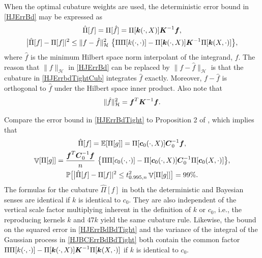 \documentclass[sts]{imsart}
\numberwithin{equation}{section}
\theoremstyle{plain}
\newcommand{\calH}{\mathcal{H}}
\newcommand{\vC}{\boldsymbol{C}}
\DeclareMathOperator{\Var}{\mathbb{V}}
\newcommand{\BOGOS}{\citetalias{BriEtal18a}}%
\begin{document}
When the optimal cubature weights are used, the deterministic error bound in \eqref{HJErrBd} may be expressed as
\begin{subequations} \label{HJErrBdTight}
\begin{gather} 
    \label{HJErrbdTightCub}
    \hat{\Pi}[f] = \Pi[\hat{f}] = \Pi[\vk(\cdot, X)] \vK^{-1} \vf, \\
    \label{HJErrBdBdTight}
    \bigl \lvert \hat{\Pi}[f] - \Pi[f] \rvert^2 \le \lVert f - \hat{f}  \rVert_{\calH}^2 \ \bigl \{ \Pi\Pi[k(\cdot,\cdot)] - \Pi[\vk(\cdot, X)]\vK^{-1} \Pi[\vk(X,\cdot)]\bigr \} ,
\end{gather}
\end{subequations}
where $\hat{f}$ is the minimum Hilbert space norm interpolant of the integrand, $f$.  The reason that $\lVert f \rVert_{\calH}$ in \eqref{HJErrBd} can be replaced by $\lVert f - \hat{f} \rVert_{\calH}$ is that the cubature in \eqref{HJErrbdTightCub} integrates $\hat{f}$ exactly. Moreover, $f - \hat{f}$ is orthogonal to $\hat{f}$ under the Hilbert space inner product.  Also note that
\begin{equation} \label{splinenorm}
   \lVert \hat{f}  \rVert^2_{\calH} = \vf^T \vK^{-1} \vf.
\end{equation}


Compare the error bound in \eqref{HJErrBdTight} to Proposition 2 of \BOGOS{}, which implies that 
\begin{subequations} \label{HJBCErrBdTight}
\begin{gather} 
\label{HJBCErrbdTightCub}
    \hat{\Pi}[f] = \Ex[\Pi[g]] = \Pi[\vc_0(\cdot, X)] \vC_0^{-1} \vf , \\
    \Var[\Pi[g]] = \frac{\vf^T \vC_0^{-1} \vf}{n} \ \bigl \{ \Pi\Pi[c_0(\cdot,\cdot)] - \Pi[\vc_0(\cdot, X)]\vC_0^{-1} \Pi[\vc_0(X,\cdot)] \bigr \} , \\
    \label{HJBCErrBdBdTight}
    \Prob\bigl[ \bigl \lvert \hat{\Pi}[f] - \Pi[f] \rvert^2 \le t_{0.995,n}^2 \Var[\Pi[g]] \bigr] = 99\%.
\end{gather}
\end{subequations}
The formulas for the cubature $\hat{\Pi}[f]$ in both the deterministic and Bayesian senses are identical if $k$ is identical to $c_0$.  They are also independent of the vertical scale factor multiplying inherent in the definition of $k$ or $c_0$, i.e., the reproducing kernels $k$ and $47k$ yield the same cubature rule.  Likewise, the bound on the squared error in \eqref{HJErrBdBdTight} and the variance of the integral of the Gaussian process in \eqref{HJBCErrBdBdTight} both contain the common factor $\Pi\Pi[k(\cdot,\cdot)] - \Pi[\boldsymbol{k}(\cdot, X)]\boldsymbol{K}^{-1} \Pi[\boldsymbol{k}(X,\cdot)]$ if $k$ is identical to $c_0$.
\end{document}
